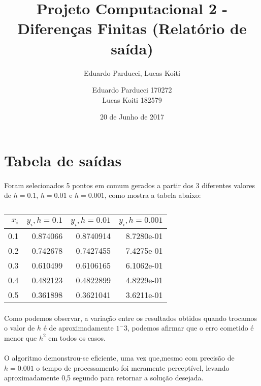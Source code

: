\documentclass{coursepaper}
\author{Eduardo Parducci, Lucas Koiti}
\title{Projeto Computacional 2 - Diferenças Finitas (Relatório de saída)}
\author{Eduardo Parducci 170272\\Lucas Koiti 182579}
\date{20 de Junho de 2017}
\begin{document}
    \maketitle

    \section{Tabela de saídas}
        \paragraph{}
        Foram selecionados 5 pontos em comum gerados a partir dos 3 diferentes valores de $h=0.1$, $h=0.01$ e $h=0.001$, como mostra a tabela abaixo:\\

        \begin{table}[h]
        \centering
        \caption{}
        \begin{tabular}{r|r|r|r}

        $x_{i}$ & $y_{i}, h=0.1$ & $y_{i}, h=0.01$ & $y_{i}, h=0.001$ \\
        \hline                               %
        0.1 &   0.874066  &  0.8740914  & 8.7280e-01\\
        0.2 &   0.742678  &  0.7427455  & 7.4275e-01\\
        0.3 &   0.610499  &  0.6106165  & 6.1062e-01\\
        0.4 &   0.482123  &  0.4822899  & 4.8229e-01\\
        0.5 &   0.361898  &  0.3621041  & 3.6211e-01

        \end{tabular}
        \end{table}

        \paragraph{}
        Como podemos observar, a variação entre os resultados obtidos quando trocamos o valor de $h$ é de aproximadamente $1^-3$, podemos afirmar que o erro cometido é menor que $h^2$ em todos os casos.

        \paragraph{}
        O algoritmo demonstrou-se eficiente, uma vez que,mesmo com precisão de $h=0.001$ o tempo de processamento foi meramente perceptível, levando aproximadamente 0,5 segundo para retornar a solução desejada.
\end{document}
